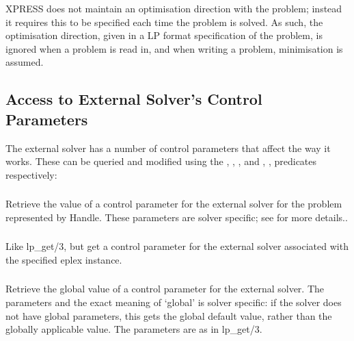 XPRESS does not maintain an optimisation direction with the problem;
instead it requires this to be specified each time the problem is
solved. As such, the optimisation direction, given in a LP format
specification of the problem, is ignored when a problem is read in, and
when writing a problem, minimisation is assumed. 



\subsection{Access to External Solver's Control Parameters}

The external solver has a number of control
parameters that affect the way it works.
These can be queried and modified using the
,  
,
, and
, 
, 
 predicates respectively:

\subsubsection{}
Retrieve the value of a control parameter for the external solver for the
problem represented by Handle. These
parameters are solver specific; see
 for more details..

\subsubsection{}
Like lp_get/3, but get a control parameter for the external solver
associated with the specified eplex instance. 

\subsubsection{}
Retrieve the global value of a control parameter for the external solver. The
parameters and the exact meaning of `global' is solver specific: if the
solver does not have global parameters, this gets the global default value,
rather than the globally applicable value. The parameters are as in lp_get/3.


